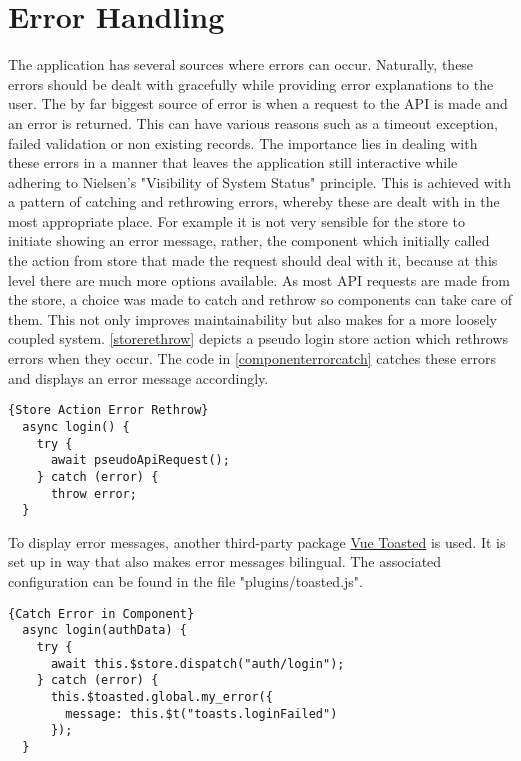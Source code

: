 \section{Error Handling}
The application has several sources where errors can occur. Naturally, these errors should be dealt with gracefully while providing error explanations to the user. The by far biggest source of error is when a request to the API is made and an error is returned. This can have various reasons such as a timeout exception, failed validation or non existing records. The importance lies in dealing with these errors in a manner that leaves the application still interactive while adhering to Nielsen's "Visibility of System Status" principle. This is achieved with a pattern of catching and rethrowing errors, whereby these are dealt with in the most appropriate place. For example it is not very sensible for the store to initiate showing an error message, rather, the component which initially called the action from store that made the request should deal with it, because at this level there are much more options available. As most API requests are made from the store, a choice was made to catch and rethrow so components can take care of them. This not only improves maintainability but also makes for a more loosely coupled system. \autoref{storerethrow} depicts a pseudo login store action which rethrows errors when they occur. The code in \autoref{componenterrorcatch} catches these errors and displays an error message accordingly. \newline

\begin{lstlisting}[caption=Store Action Error Rethrow, captionpos=b, style=htmlcssjs, label=storerethrow]{Store Action Error Rethrow}
  async login() {
    try {
      await pseudoApiRequest();
    } catch (error) {
      throw error;
  }
\end{lstlisting}

To display error messages, another third-party package \href{https://github.com/shakee93/vue-toasted}{Vue Toasted} is used. It is set up in way that also makes error messages bilingual. The associated configuration can be found in the file "plugins/toasted.js". \newline

\begin{lstlisting}[caption=Catch Error in Component, captionpos=b, style=htmlcssjs, label=componenterrorcatch]{Catch Error in Component}
  async login(authData) {
    try {
      await this.$store.dispatch("auth/login");
    } catch (error) {
      this.$toasted.global.my_error({
        message: this.$t("toasts.loginFailed")
      });
  }
\end{lstlisting}

